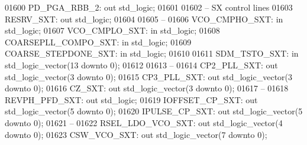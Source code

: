 \begin{DoxyCode}
01600         PD\_PGA\_RBB\_2:   \textcolor{keywordflow}{out} \textcolor{comment}{std\_logic};
01601         
01602 \textcolor{keyword}{        -- SX control lines }
01603         RESRV\_SXT:      \textcolor{keywordflow}{out} \textcolor{comment}{std\_logic};
01604         
01605 \textcolor{keyword}{        --}
01606         VCO\_CMPHO\_SXT:  \textcolor{keywordflow}{in} \textcolor{comment}{std\_logic};
01607         VCO\_CMPLO\_SXT:  \textcolor{keywordflow}{in} \textcolor{comment}{std\_logic};
01608         COARSEPLL\_COMPO\_SXT:    \textcolor{keywordflow}{in} \textcolor{comment}{std\_logic};
01609         COARSE\_STEPDONE\_SXT:    \textcolor{keywordflow}{in} \textcolor{comment}{std\_logic};
01610         
01611         SDM\_TSTO\_SXT:   \textcolor{keywordflow}{in} \textcolor{comment}{std\_logic\_vector}(\textcolor{vhdllogic}{}\textcolor{vhdllogic}{13} \textcolor{keywordflow}{downto} \textcolor{vhdllogic}{}\textcolor{vhdllogic}{0});
01612         
01613 \textcolor{keyword}{        --}
01614         CP2\_PLL\_SXT:    \textcolor{keywordflow}{out} \textcolor{comment}{std\_logic\_vector}(\textcolor{vhdllogic}{}\textcolor{vhdllogic}{3} \textcolor{keywordflow}{downto} \textcolor{vhdllogic}{}\textcolor{vhdllogic}{0});
01615         CP3\_PLL\_SXT:    \textcolor{keywordflow}{out} \textcolor{comment}{std\_logic\_vector}(\textcolor{vhdllogic}{}\textcolor{vhdllogic}{3} \textcolor{keywordflow}{downto} \textcolor{vhdllogic}{}\textcolor{vhdllogic}{0});
01616         CZ\_SXT:     \textcolor{keywordflow}{out} \textcolor{comment}{std\_logic\_vector}(\textcolor{vhdllogic}{}\textcolor{vhdllogic}{3} \textcolor{keywordflow}{downto} \textcolor{vhdllogic}{}\textcolor{vhdllogic}{0});
01617 \textcolor{keyword}{        --}
01618         REVPH\_PFD\_SXT:  \textcolor{keywordflow}{out} \textcolor{comment}{std\_logic};
01619         IOFFSET\_CP\_SXT: \textcolor{keywordflow}{out} \textcolor{comment}{std\_logic\_vector}(\textcolor{vhdllogic}{}\textcolor{vhdllogic}{5} \textcolor{keywordflow}{downto} \textcolor{vhdllogic}{}\textcolor{vhdllogic}{0});
01620         IPULSE\_CP\_SXT:  \textcolor{keywordflow}{out} \textcolor{comment}{std\_logic\_vector}(\textcolor{vhdllogic}{}\textcolor{vhdllogic}{5} \textcolor{keywordflow}{downto} \textcolor{vhdllogic}{}\textcolor{vhdllogic}{0});
01621 \textcolor{keyword}{        --}
01622         RSEL\_LDO\_VCO\_SXT:   \textcolor{keywordflow}{out} \textcolor{comment}{std\_logic\_vector}(\textcolor{vhdllogic}{}\textcolor{vhdllogic}{4} \textcolor{keywordflow}{downto} \textcolor{vhdllogic}{}\textcolor{vhdllogic}{0});
01623         CSW\_VCO\_SXT:    \textcolor{keywordflow}{out} \textcolor{comment}{std\_logic\_vector}(\textcolor{vhdllogic}{}\textcolor{vhdllogic}{7} \textcolor{keywordflow}{downto} \textcolor{vhdllogic}{}\textcolor{vhdllogic}{0});

\end{DoxyCode}
